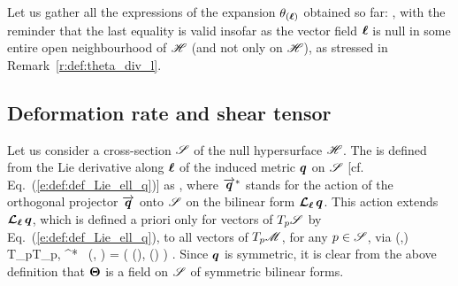 {Let us gather all the expressions of the expansion $\theta_{(\bm{\ell})}$ obtained
so far:
\be \label{e:def:theta_l_all}
     ,
\ee
with the reminder that the last equality is valid insofar as the vector field $\bm{\ell}$ is
null in some entire open neighbourhood of $\mathscr{H}$ (and not only on $\mathscr{H}$), as
stressed in Remark~\ref{r:def:theta_div_l}.

\subsection{Deformation rate and shear tensor} \label{s:def:deformation_shear}

Let us consider a cross-section $\mathscr{S}$ of the null hypersurface $\mathscr{H}$.
The
is defined from the Lie derivative along $\bm{\ell}$ of the induced metric $\bm{q}$ on $\mathscr{S}$
[cf. Eq.~(\ref{e:def:def_Lie_ell_q})] as
\be \label{e:def:Theta}
   ,
\ee
where $\overrightarrow{\bm{q}}^*$ stands for the action of the orthogonal projector $\overrightarrow{\bm{q}}$
onto $\mathscr{S}$ on the bilinear form $\bm{\mathcal{L}}_{\bm{\ell}}\, \bm{q}$.
This action extends $\bm{\mathcal{L}}_{\bm{\ell}}\, \bm{q}$, which is defined a priori only
for vectors of $T_p\mathscr{S}$ by Eq.~(\ref{e:def:def_Lie_ell_q}),
to all vectors of $T_p\mathscr{M}$, for any $p\in\mathscr{S}$, via
\be
    \forall (,) \in T_p\M \times T_p\M, \quad
         ^* \Lie{\el} \,  (, ) =
         \Lie{\el}  \left( (), () \right) .
\ee
Since $\bm{q}$ is symmetric, it is clear from the above definition that
$\bm{\Theta}$ is a field on $\mathscr{S}$ of symmetric bilinear forms.

}
